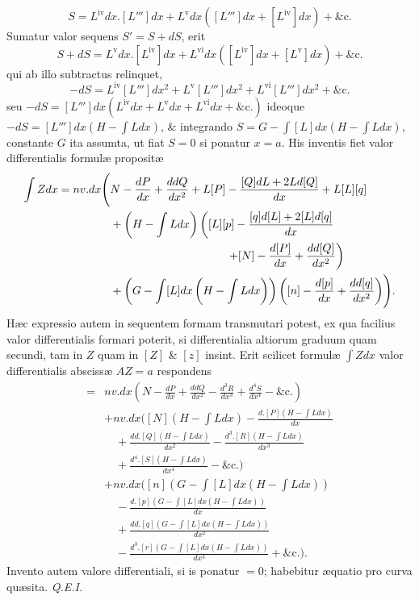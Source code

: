 \[
S=L^{\mathrm{iv}}dx.[L''']dx+L^{\mathrm{v}}dx([L''']dx+[L^{\mathrm{iv}}]dx)+\text{\&c.}
\]
Sumatur valor sequens $S'=S+dS$, erit
\[
S+dS=L^{\mathrm{v}}dx.[L^{\mathrm{iv}}]dx+L^{\mathrm{vi}}dx([L^{\mathrm{iv}}]dx+[L^{\mathrm{v}}]dx)+\text{\&c.}
\]
qui ab illo subtractus relinquet,
\[
-dS=L^{\mathrm{iv}}[L''']dx^2+L^{\mathrm{v}}[L''']dx^2+L^{\mathrm{vi}}[L''']dx^2+\text{\&c.}
\]
seu $-dS=[L''']dx(L^{\mathrm{iv}}dx+L^{\mathrm{v}}dx+L^{\mathrm{vi}}dx+\text{\&c.})$ ideoque $-dS=[L''']dx(H-\int Ldx)$, \& integrando $S=G-\int[L]dx(H-\int Ldx)$, constante $G$ ita assumta, ut fiat $S=0$ si ponatur $x=a$. His inventis fiet valor differentialis formulæ propositæ
\[
\begin{aligned}
\int Zdx=nv.dx\Biggl(&N-\frac{dP}{dx}+\frac{ddQ}{dx^2}+L[P]-\frac{[Q]dL+2Ld[Q]}{dx}+L[L][q]\\
&+\left(H-\int Ldx\right)\left([L][p]-\frac{[q]d[L]+2[L]d[q]}{dx}\right.\\
&\hspace{36mm}\left.+[N]-\frac{d[P]}{dx}+\frac{dd[Q]}{dx^2}\right)\\
&+\left(G-\int[L]dx\left(H-\int Ldx\right)\right)\left([n]-\frac{d[p]}{dx}+\frac{dd[q]}{dx^2}\right)\Biggr).
\end{aligned}
\]
Hæc expressio autem in sequentem formam transmutari potest, ex qua facilius valor differentialis formari poterit, si differentialia altiorum graduum quam secundi, tam in $Z$ quam in $[Z]$ \& $[z]$ insint. Erit scilicet formulæ $\int Zdx$ valor differentialis abscissæ $AZ=a$ respondens
\[
\begin{aligned}
={}&nv.dx\left(N-\frac{dP}{dx}+\frac{ddQ}{dx^2}-\frac{d^3R}{dx^3}+\frac{d^4S}{dx^4}-\text{\&c.}\right)\\
&+nv.dx\Biggl([N]\left(H-\int Ldx\right)-\frac{d.[P](H-\int Ldx)}{dx}\\
&\quad+\frac{dd.[Q](H-\int Ldx)}{dx^2}-\frac{d^3.[R](H-\int Ldx)}{dx^3}\\
&\quad+\frac{d^4.[S](H-\int Ldx)}{dx^4}-\text{\&c.}\Biggr)\\
&+nv.dx\Biggl([n]\left(G-\int[L]dx\left(H-\int Ldx\right)\right)\\
&\quad-\frac{d.[p](G-\int[L]dx(H-\int Ldx))}{dx}\\
&\quad+\frac{dd.[q](G-\int[L]dx(H-\int Ldx))}{dx^2}\\
&\quad-\frac{d^3.[r](G-\int[L]dx(H-\int Ldx))}{dx^3}+\text{\&c.}\Biggr).
\end{aligned}
\]
Invento autem valore differentiali, si is ponatur $=0$; habebitur æquatio pro curva quæsita. \textit{Q.E.I.}
